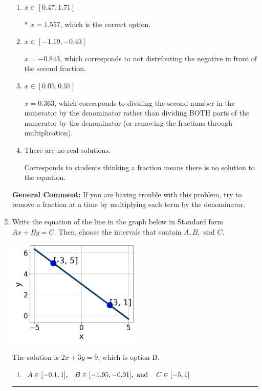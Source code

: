\documentclass{extbook}[14pt]
\newcommand{\litem}[1]{\item #1

\rule{\textwidth}{0.4pt}}
\begin{document}
\begin{enumerate}
{\begin{enumerate}[label=\Alph*.]
 $x = 9.429$, which corresponds to dividing the coefficients in front of x by the denominator rather than dividing BOTH parts of the numerator by the denominator (or removing the fractions through multiplication).
\item \( x \in [0.47, 1.71] \)

* $x = 1.557$, which is the correct option.
\item \( x \in [-1.19, -0.43] \)

 $x = -0.843$, which corresponds to not distributing the negative in front of the second fraction.
\item \( x \in [0.05, 0.55] \)

 $x = 0.363$, which corresponds to dividing the second number in the numerator by the denominator rather than dividing BOTH parts of the numerator by the denominator (or removing the fractions through multiplication).
\item \( \text{There are no real solutions.} \)

Corresponds to students thinking a fraction means there is no solution to the equation.
\end{enumerate}

\textbf{General Comment:} If you are having trouble with this problem, try to remove a fraction at a time by multiplying each term by the denominator.
}
\litem{
Write the equation of the line in the graph below in Standard form $Ax+By=C$. Then, choose the intervals that contain $A, B, \text{ and } C$.

\begin{center}
    \includegraphics[width=0.5\textwidth]{../Figures/linearGraphToStandardA.png}
\end{center}



The solution is \( 2x + 3y = 9 \), which is option B.\begin{enumerate}[label=\Alph*.]
\item \( A \in [-0.1, 1], \hspace{3mm} B \in [-1.95, -0.91], \text{ and } \hspace{3mm} C \in [-5, 1] \)


\end{enumerate}}
\end{enumerate}
\end{document}
